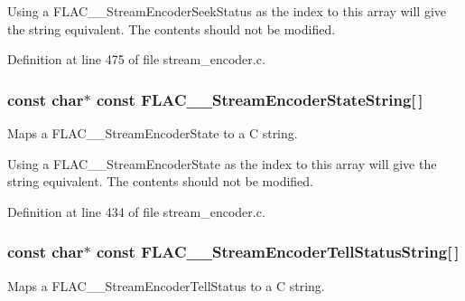 Using a F\+L\+A\+C\+\_\+\+\_\+\+Stream\+Encoder\+Seek\+Status as the index to this array will give the string equivalent. The contents should not be modified. 

Definition at line 475 of file stream\+\_\+encoder.\+c.

\subsubsection[{\texorpdfstring{F\+L\+A\+C\+\_\+\+\_\+\+Stream\+Encoder\+State\+String}{FLAC__StreamEncoderStateString}}]{ {\bf const} char$\ast$ {\bf const} F\+L\+A\+C\+\_\+\+\_\+\+Stream\+Encoder\+State\+String\mbox{[}$\,$\mbox{]}}\hypertarget{group__flac__stream__encoder_ga421c1d86de745d3095b4c5d9af1ef0de}{}\label{group__flac__stream__encoder_ga421c1d86de745d3095b4c5d9af1ef0de}
Maps a F\+L\+A\+C\+\_\+\+\_\+\+Stream\+Encoder\+State to a C string.

Using a F\+L\+A\+C\+\_\+\+\_\+\+Stream\+Encoder\+State as the index to this array will give the string equivalent. The contents should not be modified. 

Definition at line 434 of file stream\+\_\+encoder.\+c.

\subsubsection[{\texorpdfstring{F\+L\+A\+C\+\_\+\+\_\+\+Stream\+Encoder\+Tell\+Status\+String}{FLAC__StreamEncoderTellStatusString}}]{ {\bf const} char$\ast$ {\bf const} F\+L\+A\+C\+\_\+\+\_\+\+Stream\+Encoder\+Tell\+Status\+String\mbox{[}$\,$\mbox{]}}\hypertarget{group__flac__stream__encoder_ga53ed1172a97be80e75f493c060eff8d4}{}\label{group__flac__stream__encoder_ga53ed1172a97be80e75f493c060eff8d4}
Maps a F\+L\+A\+C\+\_\+\+\_\+\+Stream\+Encoder\+Tell\+Status to a C string.

